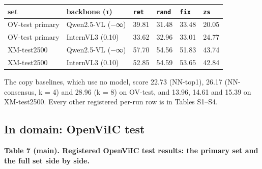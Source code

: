 \documentclass[manuscript,screen]{acmart}
\begin{document}
\begin{longtable}[]{@{}llllll@{}}
\toprule\noalign{}
set & backbone (τ) & \texttt{ret} & \texttt{rand} & \texttt{fix} & \texttt{zs} \\
\midrule\noalign{}
\endhead
\bottomrule\noalign{}
\endlastfoot
OV-test primary & Qwen2.5-VL (−∞) & 39.81 & 31.48 & 33.48 & 20.05 \\
OV-test primary & InternVL3 (0.10) & 33.62 & 32.96 & 33.01 & 24.77 \\
XM-test2500 & Qwen2.5-VL (−∞) & 57.70 & 54.56 & 51.83 & 43.74 \\
XM-test2500 & InternVL3 (0.10) & 52.85 & 54.59 & 53.65 & 42.84 \\
\end{longtable}

The copy baselines, which use no model, score 22.73 (NN-top1), 26.17 (NN-consensus, k = 4) and 28.96
(k = 8) on OV-test, and 13.96, 14.61 and 15.39 on XM-test2500. Every other registered per-run row is
in Tables S1--S4.

\subsection{In domain: OpenViIC test}\label{in-domain-openviic-test}

\textbf{Table 7 (main). Registered OpenViIC test results: the primary set and the full set side by
side.}
\end{document}
